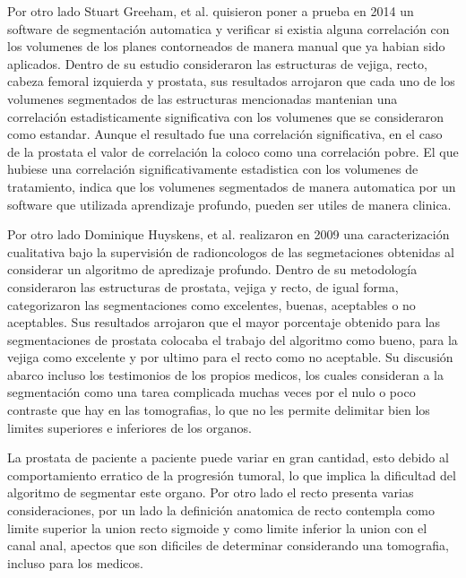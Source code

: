 \documentclass{article}
\begin{document}
\vspace{10pt}

Por otro lado Stuart Greeham, et al. quisieron poner a prueba en 2014 un software de segmentación automatica y verificar si existia alguna correlación con los volumenes de los planes contorneados de manera manual que ya habian sido aplicados. Dentro de su estudio consideraron las estructuras de vejiga, recto, cabeza femoral izquierda y prostata, sus resultados arrojaron que cada uno de los volumenes segmentados de las estructuras mencionadas mantenian una correlación estadisticamente significativa con los volumenes que se consideraron como estandar. Aunque el resultado fue una correlación significativa, en el caso de la prostata el valor de correlación la coloco como una correlación pobre. El que hubiese una correlación significativamente estadistica con los volumenes de tratamiento, indica que los volumenes segmentados de manera automatica por un software que utilizada aprendizaje profundo, pueden ser utiles de manera clinica.

\vspace{10pt}


Por otro lado Dominique Huyskens, et al. realizaron en 2009 una caracterización cualitativa bajo la supervisión de radioncologos de las segmetaciones obtenidas al considerar un algoritmo de apredizaje profundo. Dentro de su metodología consideraron las estructuras de prostata, vejiga y recto, de igual forma, categorizaron las segmentaciones como excelentes, buenas, aceptables o no aceptables. Sus resultados arrojaron que el mayor porcentaje obtenido para las segmentaciones de prostata colocaba el trabajo del algoritmo como bueno, para la vejiga como excelente y por ultimo para el recto como no aceptable. Su discusión abarco incluso los testimonios de los propios medicos,  los cuales consideran a la segmentación como una tarea complicada muchas veces por el nulo o poco contraste que hay en las tomografias, lo que no les permite delimitar bien los limites superiores e inferiores de los organos. 

\vspace{10pt}


La prostata de paciente a paciente puede variar en gran cantidad, esto debido al comportamiento erratico de la progresión tumoral, lo que implica la dificultad del algoritmo de segmentar este organo. Por otro lado el recto presenta varias consideraciones, por un lado la definición anatomica de recto contempla como limite superior la union recto sigmoide y como limite inferior la union con el canal anal, apectos que son dificiles de determinar considerando una tomografia, incluso para los medicos.
\end{document}
